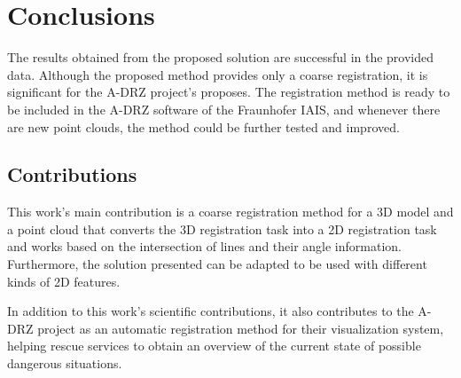 

    \chapter{Conclusions}

    The results obtained from the proposed solution are successful in the provided data.
    Although the proposed method provides only a coarse registration, it is significant for the A-DRZ project’s proposes. 
    The registration method is ready to be included in the A-DRZ software of the Fraunhofer IAIS, 
    and whenever there are new point clouds, the method could be further tested and improved.

    \section{Contributions}
        This work’s main contribution is a coarse registration method for a 3D model and a point cloud 
        that converts the 3D registration task into a 2D registration task and works based on the intersection of lines and their angle information. 
        Furthermore, the solution presented can be adapted to be used with different kinds of 2D features.
    
        In addition to this work’s scientific contributions, 
        it also contributes to the A-DRZ project as an automatic registration method for their visualization system, 
        helping rescue services to obtain an overview of the current state of possible dangerous situations.
    


